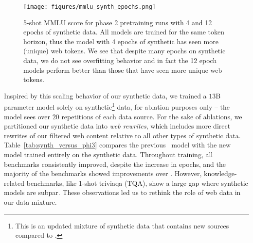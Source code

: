 \begin{figure}[ht]
    \centering
    \texttt{[image: figures/mmlu\_synth\_epochs.png]}
    \caption{5-shot MMLU score for phase 2 pretraining runs with 4 and 12 epochs of synthetic data. All models are trained for the same token horizon, thus the model with 4 epochs of synthetic has seen more (unique) web tokens. We see that despite many epochs on synthetic data, we do not see overfitting behavior and in fact the 12 epoch models perform better than those that have seen more unique web tokens.}
    \label{fig:synth_epochs}
\end{figure}

Inspired by this scaling behavior of our synthetic data, we trained a $13$B parameter model solely on synthetic\footnote{This is an updated mixture of synthetic data that contains new sources compared to \phithree{}.} data, for ablation purposes only -- the model sees over $20$ repetitions of each data source. For the sake of ablations, we partitioned our synthetic data into \emph{web rewrites}, which includes more direct rewrites of our filtered web content relative to all other types of synthetic data.
Table~\ref{tab:synth_versus_phi3} compares the previous \phithreemed~model with the new model trained entirely on the synthetic data. Throughout training, all benchmarks consistently improved, despite the increase in epochs, and the majority of the benchmarks showed improvements over \phithree{}. However, knowledge-related benchmarks, like 1-shot triviaqa (TQA), show a large gap where synthetic models are subpar. These observations led us to rethink the role of web data in our data mixture. 

\begin{table}[ht]
\centering
{}
\caption{Benchmark performance of $13$B models (used for ablations only) trained on data mixtures containing no web data. The respective training tokens are either from synthetic sources, or an equal share of synthetic data and web rewrites. All numbers are reported relative to the performance of \phithreemed, which has seen a combination of web and synthetic data.}
\label{tab:synth_versus_phi3}
\end{table}

